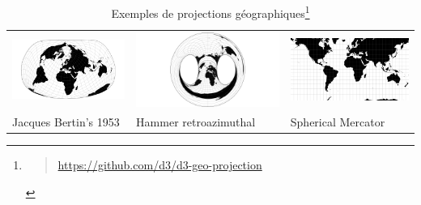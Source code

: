 \documentclass[
  letterpaper,
  DIV=11,
  numbers=noendperiod]{scrreprt}
\begin{document}
\hypertarget{tbl-projGeo}{}
\begin{longtable}[]{@{}
  >{\raggedright\arraybackslash}p{}
  >{\raggedright\arraybackslash}p{}
  >{\raggedright\arraybackslash}p{}@{}}
\caption[\label{tbl-projGeo}Exemples de projections
géographiques]{\label{tbl-projGeo}Exemples de projections
géographiques\footnote{\begin{quote}
  \url{https://github.com/d3/d3-geo-projection}
  \end{quote}}}\tabularnewline
\toprule\noalign{}
\endfirsthead
\endhead
\bottomrule\noalign{}
\endlastfoot
\includegraphics{media/10000000000003C0000001F4F33DE5F8AECF42B5.png} &
\includegraphics{media/10000000000003C0000001F46900D5D2AB4D8E23.png} &
\includegraphics{media/10000000000003C0000001F47F8100241BAEED66.png} \\
Jacques Bertin's 1953 & Hammer retroazimuthal & Spherical Mercator \\
\end{longtable}
\end{document}
